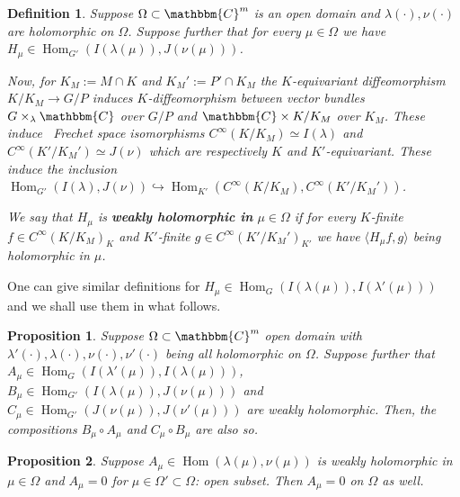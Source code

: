 \documentclass{article}
\newcommand{\assign}{:=}
\newcommand{\tmop}[1]{\ensuremath{\operatorname{#1}}}
\newcommand{\tmtextbf}[1]{{\bfseries{#1}}}
\newtheorem{definition}{Definition}
\newtheorem{proposition}{Proposition}
{\theorembodyfont{\rmfamily}\newtheorem{remark}{Remark}}
\begin{document}
\begin{definition}
  \label{holoop:def-weakholo}Suppose $\Omega \subset \mathbbm{C}^m$ is an open
  domain and $\lambda (\cdot), \nu (\cdot)$ are holomorphic on $\Omega$.
  Suppose further that for every $\mu \in \Omega$ we have $H_{\mu} \in
  \tmop{Hom}_{G'} (I (\lambda (\mu)), J (\nu (\mu)))$.
  
  Now, for $K_M \assign M \cap K$ and $K_M' \assign P' \cap K_M$ the
  $K$-equivariant diffeomorphism $K / K_M \rightarrow G / P$ induces
  $K$-diffeomorphism between vector bundles $G \times_{\lambda} \mathbbm{C}$
  over $G / P$ and $\mathbbm{C} \times K / K_M$ over $K_M$. These induce \
  Frechet space isomorphisms $C^{\infty} (K / K_M) \simeq I (\lambda)$ and
  $C^{\infty} (K' / K_M') \simeq J (\nu)$ which are respectively $K$ and
  $K'$-equivariant. These induce the inclusion $\tmop{Hom}_{G'} (I (\lambda),
  J (\nu)) \hookrightarrow \tmop{Hom}_{K'} (C^{\infty} (K / K_M), C^{\infty}
  (K' / K_M'))$.
  
  We say that $H_{\mu}$ is \tmtextbf{weakly holomorphic in} $\mu \in \Omega$
  if for every $K$-finite $f \in C^{\infty} (K / K_M)_K$ and $K'$-finite $g
  \in C^{\infty} (K' / K_M')_{K'}$ we have $\langle H_{\mu} f, g \rangle$
  being holomorphic in $\mu$.
\end{definition}

\begin{remark}
  One can give similar definitions for $H_{\mu} \in \tmop{Hom}_G (I (\lambda
  (\mu)), I (\lambda' (\mu)))$ and we shall use them in what follows.
\end{remark}

\begin{proposition}
  \label{holoop:prop-comp-of-holo-is-holo}Suppose $\Omega \subset
  \mathbbm{C}^m$ open domain with $\lambda' (\cdot), \lambda (\cdot), \nu
  (\cdot), \nu' (\cdot)$ being all holomorphic on $\Omega$. Suppose further
  that $A_{\mu} \in \tmop{Hom}_G (I (\lambda' (\mu)), I (\lambda (\mu)))$,
  $B_{\mu} \in \tmop{Hom}_{G'} (I (\lambda (\mu)), J (\nu (\mu)))$ and
  $C_{\mu} \in \tmop{Hom}_{G'} (J (\nu (\mu)), J (\nu' (\mu)))$ are weakly
  holomorphic. Then, the compositions $B_{\mu} \circ A_{\mu}$ and $C_{\mu}
  \circ B_{\mu}$ are also so.
\end{proposition}

\begin{proposition}
  \label{holoop:prop-holo-rigidity}Suppose $A_{\mu} \in \tmop{Hom} (\lambda
  (\mu), \nu (\mu))$ is weakly holomorphic in $\mu \in \Omega$ and $A_{\mu} =
  0$ for $\mu \in \Omega' \subset \Omega$: open subset. Then $A_{\mu} = 0$ on
  $\Omega$ as well.
\end{proposition}
\end{document}
